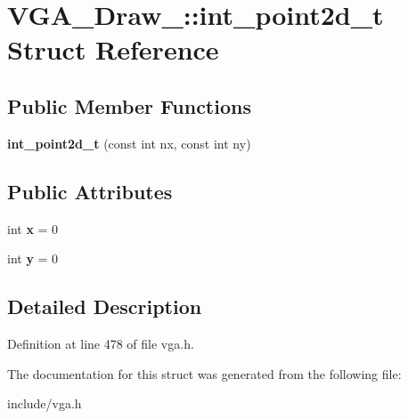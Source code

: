 \hypertarget{structVGA__Draw__2_1_1int__point2d__t}{\section{V\-G\-A\-\_\-\-Draw\-\_\-:\-:int\-\_\-point2d\-\_\-t Struct Reference}
\label{structVGA__Draw__2_1_1int__point2d__t}
}
\subsection*{Public Member Functions}
\begin{DoxyCompactItemize}
\item 
\hypertarget{structVGA__Draw__2_1_1int__point2d__t_ab2e0689ac14210bfb6914ff202083d9f}{{\bfseries int\-\_\-point2d\-\_\-t} (const int nx, const int ny)}\label{structVGA__Draw__2_1_1int__point2d__t_ab2e0689ac14210bfb6914ff202083d9f}

\end{DoxyCompactItemize}
\subsection*{Public Attributes}
\begin{DoxyCompactItemize}
\item 
\hypertarget{structVGA__Draw__2_1_1int__point2d__t_a11b5ee4697f997b4530956c211d22291}{int {\bfseries x} = 0}\label{structVGA__Draw__2_1_1int__point2d__t_a11b5ee4697f997b4530956c211d22291}

\item 
\hypertarget{structVGA__Draw__2_1_1int__point2d__t_a19ef0e4503e6a975770adbf2e39d9300}{int {\bfseries y} = 0}\label{structVGA__Draw__2_1_1int__point2d__t_a19ef0e4503e6a975770adbf2e39d9300}

\end{DoxyCompactItemize}


\subsection{Detailed Description}


Definition at line 478 of file vga.\-h.



The documentation for this struct was generated from the following file\-:\begin{DoxyCompactItemize}
\item 
include/vga.\-h\end{DoxyCompactItemize}
